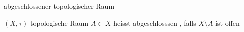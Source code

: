 \documentclass[class=article, crop=false]{standalone}
\begin{document}
\begin{zettel}{abgeschlossener topologischer Raum}
\begin{flashcard}
\begin{definition}[abgeschlossen]
   $(X, \tau )$  topologische Raum $ A \subset X$  heisst abgeschlosssen , falls $ X \setminus A$  ist offen
\end{definition}

\end{flashcard}
\end{zettel}
\end{document}
